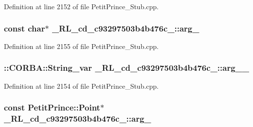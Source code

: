 Definition at line 2152 of file Petit\+Prince\+\_\+\+Stub.\+cpp.

\subsubsection[{\texorpdfstring{arg\+\_\+0}{arg_0}}]{\setlength{\rightskip}{0pt plus 5cm}const char$\ast$ \+\_\+R\+L\+\_\+cd\+\_\+c93297503b4b476c\+\_\+::arg\+\_}\hypertarget{class__0_r_l__cd__c93297503b4b476c__31000000_ab8f8fb171826c479fa1d20a6ae75bc8a}{}\label{class__0_r_l__cd__c93297503b4b476c__31000000_ab8f8fb171826c479fa1d20a6ae75bc8a}


Definition at line 2155 of file Petit\+Prince\+\_\+\+Stub.\+cpp.

\subsubsection[{\texorpdfstring{arg\+\_\+0\+\_\+}{arg_0_}}]{\setlength{\rightskip}{0pt plus 5cm}\+::C\+O\+R\+B\+A\+::\+String\+\_\+var \+\_\+R\+L\+\_\+cd\+\_\+c93297503b4b476c\+\_\+::arg\+\_\+\_\+}\hypertarget{class__0_r_l__cd__c93297503b4b476c__31000000_a363b01496bb066cf3148298983a6f5ca}{}\label{class__0_r_l__cd__c93297503b4b476c__31000000_a363b01496bb066cf3148298983a6f5ca}


Definition at line 2154 of file Petit\+Prince\+\_\+\+Stub.\+cpp.

\subsubsection[{\texorpdfstring{arg\+\_\+1}{arg_1}}]{\setlength{\rightskip}{0pt plus 5cm}const Petit\+Prince\+::\+Point$\ast$ \+\_\+R\+L\+\_\+cd\+\_\+c93297503b4b476c\+\_\+::arg\+\_}\hypertarget{class__0_r_l__cd__c93297503b4b476c__31000000_ad21353f2fa5950438e3ed7ca1077177b}{}\label{class__0_r_l__cd__c93297503b4b476c__31000000_ad21353f2fa5950438e3ed7ca1077177b}


